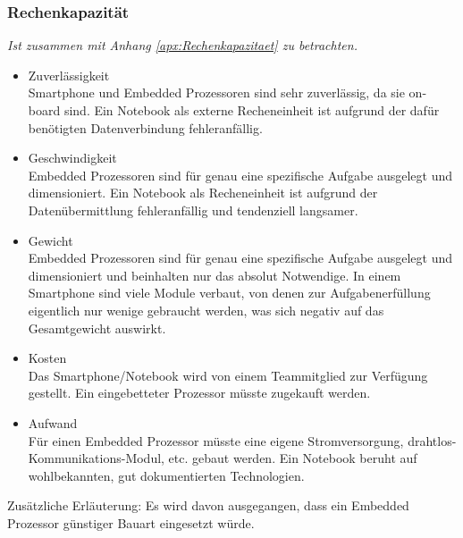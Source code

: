 		\subsubsection{Rechenkapazität}
			\textit{Ist zusammen mit Anhang \ref{apx:Rechenkapazitaet} zu betrachten.}
			\begin{itemize}
				\item Zuverlässigkeit\\
				Smartphone und Embedded Prozessoren sind sehr zuverlässig, da sie on-board sind. Ein Notebook als externe Recheneinheit ist aufgrund der dafür benötigten Datenverbindung fehleranfällig.
				\item Geschwindigkeit\\
				Embedded Prozessoren sind für genau eine spezifische Aufgabe ausgelegt und dimensioniert. Ein Notebook als Recheneinheit ist aufgrund der Datenübermittlung fehleranfällig und tendenziell langsamer.
			 	\item Gewicht\\
			 	Embedded Prozessoren sind für genau eine spezifische Aufgabe ausgelegt und dimensioniert und beinhalten nur das absolut Notwendige. In einem Smartphone sind viele Module verbaut, von denen zur Aufgabenerfüllung eigentlich nur wenige gebraucht werden, was sich negativ auf das Gesamtgewicht auswirkt.
				\item Kosten\\
				Das Smartphone/Notebook wird von einem Teammitglied zur Verfügung gestellt. Ein eingebetteter Prozessor müsste zugekauft werden.
				\item Aufwand\\
				Für einen Embedded Prozessor müsste eine eigene Stromversorgung, drahtlos-Kommunikations-Modul, etc. gebaut werden. Ein Notebook beruht auf wohlbekannten, gut dokumentierten Technologien.
			\end{itemize}
			Zusätzliche Erläuterung: Es wird davon ausgegangen, dass ein Embedded Prozessor günstiger Bauart eingesetzt würde.
			
